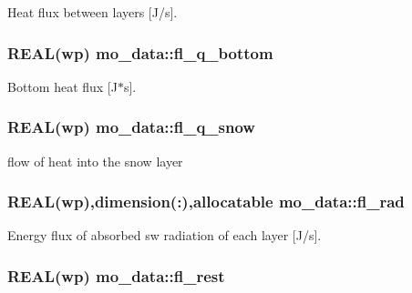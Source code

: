 Heat flux between layers \mbox{[}J/s\mbox{]}. 

\hypertarget{namespacemo__data_acd16d86818624a2eb95bfed83a2a1d76}{
\subsubsection[{fl\_\-q\_\-bottom}]{\setlength{\rightskip}{0pt plus 5cm}REAL(wp) {\bf mo\_\-data::fl\_\-q\_\-bottom}}}
\label{namespacemo__data_acd16d86818624a2eb95bfed83a2a1d76}


Bottom heat flux \mbox{[}J$\ast$s\mbox{]}. 

\hypertarget{namespacemo__data_ab90ffe7683553449ecf8c78d478cb40e}{
\subsubsection[{fl\_\-q\_\-snow}]{\setlength{\rightskip}{0pt plus 5cm}REAL(wp) {\bf mo\_\-data::fl\_\-q\_\-snow}}}
\label{namespacemo__data_ab90ffe7683553449ecf8c78d478cb40e}


flow of heat into the snow layer 

\hypertarget{namespacemo__data_aac6756d0384948c5717bdbabb4e1b748}{
\subsubsection[{fl\_\-rad}]{\setlength{\rightskip}{0pt plus 5cm}REAL(wp),dimension(:),allocatable {\bf mo\_\-data::fl\_\-rad}}}
\label{namespacemo__data_aac6756d0384948c5717bdbabb4e1b748}


Energy flux of absorbed sw radiation of each layer \mbox{[}J/s\mbox{]}. 

\hypertarget{namespacemo__data_afedf60f1ea1272e55a3d6110e0911102}{
\subsubsection[{fl\_\-rest}]{\setlength{\rightskip}{0pt plus 5cm}REAL(wp) {\bf mo\_\-data::fl\_\-rest}}}
\label{namespacemo__data_afedf60f1ea1272e55a3d6110e0911102}


